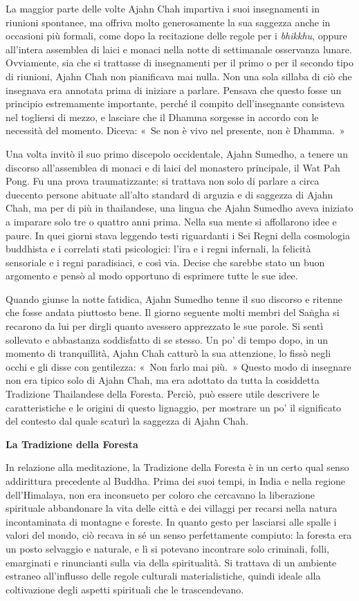 La maggior parte delle volte Ajahn Chah impartiva i suoi insegnamenti in
riunioni spontanee, ma offriva molto generosamente la sua saggezza anche
in occasioni più formali, come dopo la recitazione delle regole per i
\emph{bhikkhu}, oppure all'intera assemblea di laici e monaci nella
notte di settimanale osservanza lunare. Ovviamente, sia che si trattasse
di insegnamenti per il primo o per il secondo tipo di riunioni, Ajahn
Chah non pianificava mai nulla. Non una sola sillaba di ciò che
insegnava era annotata prima di iniziare a parlare. Pensava che questo
fosse un principio estremamente importante, perché il compito
dell'insegnante consisteva nel togliersi di mezzo, e lasciare che il
Dhamma sorgesse in accordo con le necessità del momento. Diceva: «~Se
non è vivo nel presente, non è Dhamma.~»

Una volta invitò il suo primo discepolo occidentale, Ajahn Sumedho, a
tenere un discorso all'assemblea di monaci e di laici del monastero
principale, il Wat Pah Pong. Fu una prova traumatizzante: si trattava
non solo di parlare a circa duecento persone abituate all'alto standard
di arguzia e di saggezza di Ajahn Chah, ma per di più in thailandese,
una lingua che Ajahn Sumedho aveva iniziato a imparare solo tre o
quattro anni prima. Nella sua mente si affollarono idee e paure. In quei
giorni stava leggendo testi riguardanti i Sei Regni della cosmologia
buddhista e i correlati stati psicologici: l'ira e i regni infernali, la
felicità sensoriale e i regni paradisiaci, e così via. Decise che
sarebbe stato un buon argomento e pensò al modo opportuno di esprimere
tutte le sue idee.

Quando giunse la notte fatidica, Ajahn Sumedho tenne il suo discorso e
ritenne che fosse andata piuttosto bene. Il giorno seguente molti membri
del Saṅgha si recarono da lui per dirgli quanto avessero apprezzato le
sue parole. Si sentì sollevato e abbastanza soddisfatto di se stesso. Un
po' di tempo dopo, in un momento di tranquillità, Ajahn Chah catturò la
sua attenzione, lo fissò negli occhi e gli disse con gentilezza: «~Non
farlo mai più.~» Questo modo di insegnare non era tipico solo di Ajahn
Chah, ma era adottato da tutta la cosiddetta Tradizione Thailandese
della Foresta. Perciò, può essere utile descrivere le caratteristiche e
le origini di questo lignaggio, per mostrare un po' il significato del
contesto dal quale scaturì la saggezza di Ajahn Chah.

\textbf{La Tradizione della Foresta}

In relazione alla meditazione, la Tradizione della Foresta è in un certo
qual senso addirittura precedente al Buddha. Prima dei suoi tempi, in
India e nella regione dell'Himalaya, non era inconsueto per coloro che
cercavano la liberazione spirituale abbandonare la vita delle città e
dei villaggi per recarsi nella natura incontaminata di montagne e
foreste. In quanto gesto per lasciarsi alle spalle i valori del mondo,
ciò recava in sé un senso perfettamente compiuto: la foresta era un
posto selvaggio e naturale, e lì si potevano incontrare solo criminali,
folli, emarginati e rinuncianti sulla via della spiritualità. Si
trattava di un ambiente estraneo all'influsso delle regole culturali
materialistiche, quindi ideale alla coltivazione degli aspetti
spirituali che le trascendevano.

